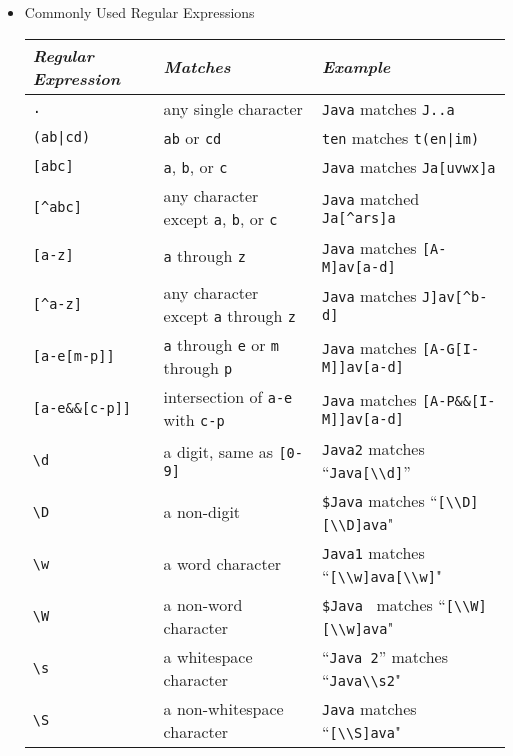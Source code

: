 \documentclass[11pt]{article}
\begin{document}
\begin{itemize}
	\item Commonly Used Regular Expressions\\
		\begin{tabular}{l l l}
			\hline
			\textit{Regular Expression} & \textit{Matches} & \textit{Example}\\
			\hline
			\hline
			\texttt{.} & any single character & \texttt{Java} matches \texttt{J..a}\\
			\texttt{(ab|cd)} & \texttt{ab} or \texttt{cd} & \texttt{ten} matches \texttt{t(en|im)}\\
			\texttt{[abc]} & \texttt{a}, \texttt{b}, or \texttt{c} & \texttt{Java} matches \texttt{Ja[uvwx]a}\\
			\texttt{[\string^abc]} & any character except \texttt{a}, \texttt{b}, or \texttt{c} & \texttt{Java} matched \texttt{Ja[\string^ars]a}\\
			\texttt{[a-z]} & \texttt{a} through \texttt{z} & \texttt{Java} matches \texttt{[A-M]av[a-d]}\\
			\texttt{[\string^a-z]} & any character except \texttt{a} through \texttt{z} & \texttt{Java} matches \texttt{J]av[\string^b-d]}\\
			\texttt{[a-e[m-p]]} & \texttt{a} through \texttt{e} or \texttt{m} through \texttt{p} & \texttt{Java} matches \texttt{[A-G[I-M]]av[a-d]}\\
			\texttt{[a-e\&\&[c-p]] }& intersection of \texttt{a-e} with \texttt{c-p} & \texttt{Java} matches \texttt{[A-P\&\&[I-M]]av[a-d]}\\
			\texttt{\textbackslash d} & a digit, same as \texttt{[0-9]} & \texttt{Java2} matches ``\texttt{Java[\textbackslash\textbackslash d]}'' \\
			\texttt{\textbackslash D} & a non-digit & \texttt{\$Java} matches ``\texttt{[\textbackslash\textbackslash D][\textbackslash\textbackslash D]ava}"\\
			\texttt{\textbackslash w} & a word character & \texttt{Java1} matches ``\texttt{[\textbackslash\textbackslash w]ava[\textbackslash\textbackslash w]}"\\
			\texttt{\textbackslash W} & a non-word character & \texttt{\$Java } matches ``\texttt{[\textbackslash\textbackslash W][\textbackslash\textbackslash w]ava}"\\
			\texttt{\textbackslash s} & a whitespace character & ``\texttt{Java 2}'' matches ``\texttt{Java\textbackslash\textbackslash s2}"\\
			\texttt{\textbackslash S} & a non-whitespace character & \texttt{Java} matches ``\texttt{[\textbackslash\textbackslash S]ava}"\\

\end{tabular}
\end{itemize}
\end{document}
